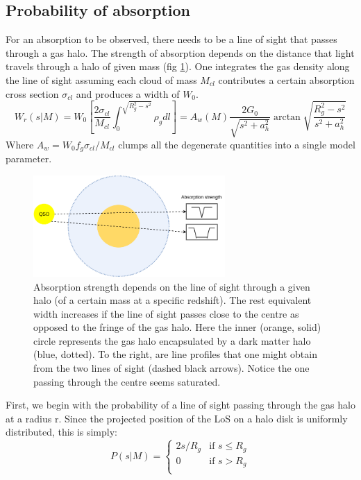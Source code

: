 \documentclass[12pt,a4paper,twoside]{book}
\begin{document}
	 	\subsection{Probability of absorption}
		 	For an absorption to be observed, there needs to be a line of sight that passes through a gas halo. The strength of absorption depends on the distance that light travels through a halo of given mass (fig \ref{fig:absorb-strength}). One integrates the gas density along the line of sight assuming each cloud of mass $M_{cl}$ contributes a certain absorption cross section $\sigma_{cl}$ and produces a width of $W_0$.
		 	$$
		 	W_r(s|M)=W_0\left[\frac{2\sigma_{cl}}{M_{cl}}\int_0^{\sqrt{R_g^2-s^2}}\rho_gdl\right]=A_w(M)\frac{2G_0}{\sqrt{s^2+a_h^2}}\arctan\sqrt{\frac{R_g^2-s^2}{s^2+a_h^2}}
		 	$$
		 	Where $A_w=W_0f_g\sigma_{cl}/M_{cl}$ clumps all the degenerate quantities into a single model parameter.
		 	\begin{figure}[h!]
		 		\centering
		 		\includegraphics[width=0.65\textwidth]{halo-absorb.png}
		 		\caption{Absorption strength depends on the line of sight through a given halo (of a certain mass at a specific redshift). The rest equivalent width increases if the line of sight passes close to the centre as opposed to the fringe of the gas halo. Here the inner (orange, solid) circle represents the gas halo encapsulated by a dark matter halo (blue, dotted). To the right, are line profiles that one might obtain from the two lines of sight (dashed black arrows). Notice the one passing through the centre seems saturated.}
		 		\label{fig:absorb-strength}
		 	\end{figure}
		 	First, we begin with the probability of a line of sight passing through the gas halo at a radius r. Since the projected position of the LoS on a halo disk is uniformly distributed, this is simply:
		 	$$
		 	P(s|M)=
		 	\begin{cases}
			 	2s/R_g&\text{if } s\leq R_g\\
			 	0&\text{if } s>R_g\\
		 	\end{cases}
		 	$$
\end{document}
